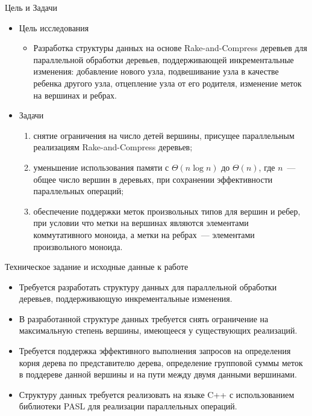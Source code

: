 \documentclass[hyperref=unicode,graphics=pdflatex,13pt]{beamer}
\begin{document}
\begin{frame}[shrink]{Цель и Задачи}
\begin{itemize}
\item Цель исследования
\begin{itemize}
\item Разработка структуры данных на основе Rake-and-Compress деревьев для параллельной обработки деревьев, поддерживающей инкрементальные изменения: добавление нового узла, подвешивание узла в 
качестве ребенка другого узла, отцепление узла от его родителя, изменение меток на вершинах и ребрах.
 \end{itemize}
\end{itemize}

\begin{itemize} \item Задачи
\begin{enumerate}
    \item снятие ограничения на число детей вершины, присущее параллельным реализациям Rake-and-Compress деревьев;
    \item уменьшение использования памяти с $\Theta(n \log n)$ до $\Theta(n)$, где $n$~--- общее число вершин в деревьях, при сохранении эффективности параллельных операций;
    \item обеспечение поддержки меток произвольных типов для вершин и ребер, при условии что метки на вершинах являются элементами коммутативного моноида, а метки на ребрах~---
          элементами произвольного моноида.
\end{enumerate}
\end{itemize}
\end{frame}

\begin{frame}[shrink]{Техническое задание и исходные данные к работе}
\begin{itemize}
\item Требуется разработать структуру данных для параллельной обработки деревьев, поддерживающую инкрементальные изменения. 
\item В разработанной структуре данных требуется снять ограничение на максимальную степень вершины, имеющееся у существующих реализаций.
\item Требуется поддержка эффективного выполнения запросов на определения корня дерева по представителю дерева, определение групповой суммы меток в поддереве данной вершины и на пути между двумя данными вершинами. 
\item Структуру данных требуется реализовать на языке C++ с использованием библиотеки PASL для реализации параллельных операций.
\end{itemize}
\end{frame}
\end{document}
